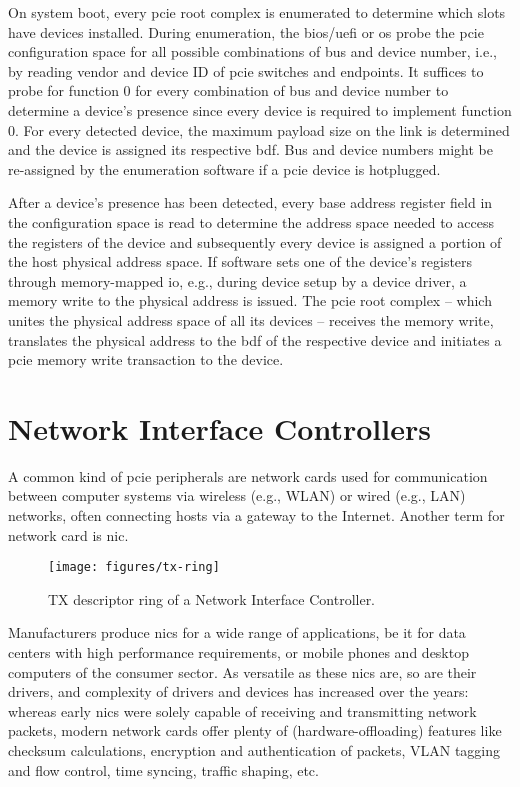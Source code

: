 On system boot, every \ac{pcie} root complex is enumerated to determine which
slots have devices installed. During enumeration, the \acs{bios}/\acs{uefi} or
\ac{os} probe the \ac{pcie} configuration space for all possible combinations of
bus and device number, i.e., by reading vendor and device ID of \ac{pcie}
switches and endpoints. It suffices to probe for function 0 for every
combination of bus and device number to determine a device's presence since
every device is required to implement function 0. For every detected device, the
maximum payload size on the link is determined and the device is assigned its
respective \ac{bdf}. Bus and device numbers might be re-assigned by the
enumeration software if a \ac{pcie} device is hotplugged.

After a device's presence has been detected, every base address register field
in the configuration space is read to determine the address space needed to
access the registers of the device and subsequently every device is assigned a
portion of the host physical address space. If software sets one of the device's
registers through memory-mapped \ac{io}, e.g., during device setup by a device
driver, a memory write to the physical address is issued. The \ac{pcie} root
complex -- which unites the physical address space of all its devices --
receives the memory write, translates the physical address to the \ac{bdf} of
the respective device and initiates a \ac{pcie} memory write transaction to the
device.


\section{Network Interface Controllers}
\label{sec:nics}

A common kind of \ac{pcie} peripherals are network cards used for communication
between computer systems via wireless (e.g., WLAN) or wired (e.g., LAN)
networks, often connecting hosts via a gateway to the Internet. Another term for
network card is \acf{nic}.

\begin{figure}[!b]
    \centering
    \texttt{[image: figures/tx-ring]}
    \caption{TX descriptor ring of a Network Interface Controller.}
    \label{fig:tx-ring}
\end{figure}

Manufacturers produce \acp{nic} for a wide range of applications, be it for data
centers with high performance requirements, or mobile phones and desktop
computers of the consumer sector. As versatile as these \acp{nic} are, so are
their drivers, and complexity of drivers and devices has increased over the
years: whereas early \acp{nic} were solely capable of receiving and transmitting
network packets, modern network cards offer plenty of (hardware-offloading)
features like checksum calculations, encryption and authentication of packets,
VLAN tagging and flow control, time syncing, traffic shaping, etc.

